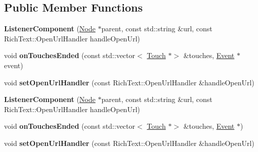 \subsection*{Public Member Functions}
\begin{DoxyCompactItemize}
\item 
\mbox{\label{classListenerComponent_a479d5cc133796bde461a3047541b453d}} 
{\bfseries Listener\+Component} (\hyperlink{classNode}{Node} $\ast$parent, const std\+::string \&url, const Rich\+Text\+::\+Open\+Url\+Handler handle\+Open\+Url)
\item 
\mbox{\label{classListenerComponent_a279c1e4c19ef849d1c2dc9154f52b0e6}} 
void {\bfseries on\+Touches\+Ended} (const std\+::vector$<$ \hyperlink{classTouch}{Touch} $\ast$$>$ \&touches, \hyperlink{classEvent}{Event} $\ast$event)
\item 
\mbox{\label{classListenerComponent_a79ce391d4e017b1405be958b61b56b93}} 
void {\bfseries set\+Open\+Url\+Handler} (const Rich\+Text\+::\+Open\+Url\+Handler \&handle\+Open\+Url)
\item 
\mbox{\label{classListenerComponent_a479d5cc133796bde461a3047541b453d}} 
{\bfseries Listener\+Component} (\hyperlink{classNode}{Node} $\ast$parent, const std\+::string \&url, const Rich\+Text\+::\+Open\+Url\+Handler handle\+Open\+Url)
\item 
\mbox{\label{classListenerComponent_acea28282d1e93f74e3ead62494902e24}} 
void {\bfseries on\+Touches\+Ended} (const std\+::vector$<$ \hyperlink{classTouch}{Touch} $\ast$$>$ \&touches, \hyperlink{classEvent}{Event} $\ast$)
\item 
\mbox{\label{classListenerComponent_a79ce391d4e017b1405be958b61b56b93}} 
void {\bfseries set\+Open\+Url\+Handler} (const Rich\+Text\+::\+Open\+Url\+Handler \&handle\+Open\+Url)
\end{DoxyCompactItemize}
